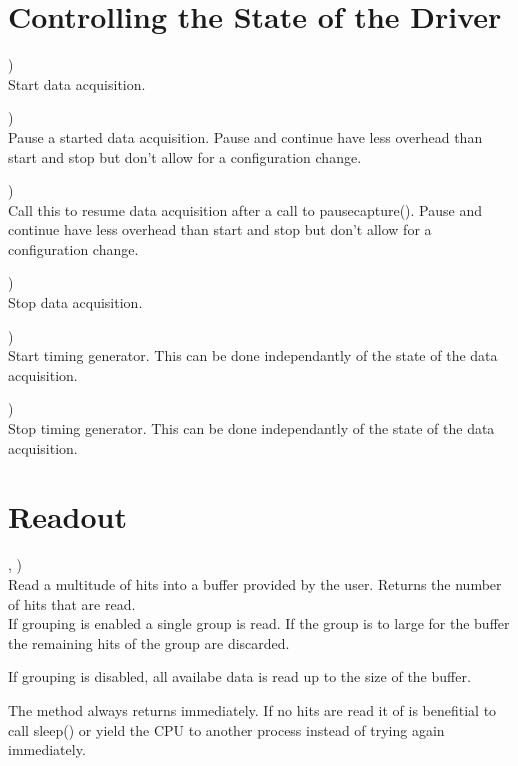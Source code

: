 	\section{Controlling the State of the Driver}
		\device)\\
		Start data acquisition.\par

		\device)\\
		Pause a started data acquisition. 
		Pause and continue have less overhead than start and stop but don't allow for a configuration change.\par

		\device)\\
		Call this to resume data acquisition after a call to \textsf{\prefix pause\tu capture()}.
		Pause and continue have less overhead than start and stop but don't allow for a configuration change.\par

		\device)\\
		Stop data acquisition.\par

		\device)\\
		Start timing generator. This can be done independantly of the state of the data acquisition.\par

		\device)\\
		Stop timing generator. This can be done independantly of the state of the data acquisition.\par

\section{Readout}

\device,    )\\
Read a multitude of hits into a buffer provided by the user. Returns the number of hits that are read.\\

If grouping is enabled a single group is read. If the group is to large for the buffer the remaining hits of the group are discarded.

If grouping is disabled, all availabe data is read up to the size of the buffer.

The method always returns immediately. If no hits are read it of is benefitial to call \textsf{sleep()} or yield the CPU to another process instead of trying again immediately.


